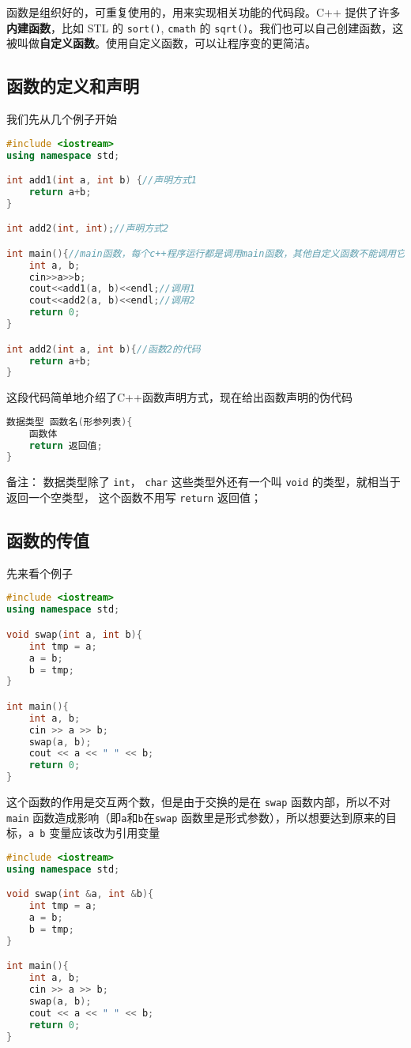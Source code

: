 
\begin{issues}
\issueDraft
\end{issues}

函数是组织好的，可重复使用的，用来实现相关功能的代码段。C++ 提供了许多\textbf{内建函数}，比如 STL 的 \verb|sort()|, \verb|cmath| 的 \verb|sqrt()|。我们也可以自己创建函数，这被叫做\textbf{自定义函数}。使用自定义函数，可以让程序变的更简洁。

\subsection{函数的定义和声明}
我们先从几个例子开始
\begin{lstlisting}[language=cpp]
#include <iostream>
using namespace std;

int add1(int a, int b) {//声明方式1
    return a+b;
}

int add2(int, int);//声明方式2

int main(){//main函数，每个c++程序运行都是调用main函数，其他自定义函数不能调用它
    int a, b;
    cin>>a>>b;
    cout<<add1(a, b)<<endl;//调用1
    cout<<add2(a, b)<<endl;//调用2
    return 0;
}

int add2(int a, int b){//函数2的代码
    return a+b;
}
\end{lstlisting}
这段代码简单地介绍了C++函数声明方式，现在给出函数声明的伪代码
\begin{lstlisting}[language=cpp]
数据类型 函数名(形参列表){
    函数体
    return 返回值;
}
\end{lstlisting}
备注： 数据类型除了 \verb|int|， \verb|char| 这些类型外还有一个叫 \verb|void| 的类型，就相当于返回一个空类型， 这个函数不用写 \verb|return| 返回值；

\subsection{函数的传值}
先来看个例子
\begin{lstlisting}[language=cpp]
#include <iostream>
using namespace std;

void swap(int a, int b){
    int tmp = a;
    a = b;
    b = tmp;
}

int main(){
    int a, b;
    cin >> a >> b;
    swap(a, b);
    cout << a << " " << b;
    return 0;
}
\end{lstlisting}
这个函数的作用是交互两个数，但是由于交换的是在 \verb|swap| 函数内部，所以不对 \verb|main| 函数造成影响（即\verb|a|和\verb|b|在\verb|swap| 函数里是形式参数），所以想要达到原来的目标，\verb|a b| 变量应该改为引用变量
\begin{lstlisting}[language=cpp]
#include <iostream>
using namespace std;

void swap(int &a, int &b){
    int tmp = a;
    a = b;
    b = tmp;
}

int main(){
    int a, b;
    cin >> a >> b;
    swap(a, b);
    cout << a << " " << b;
    return 0;
}
\end{lstlisting}